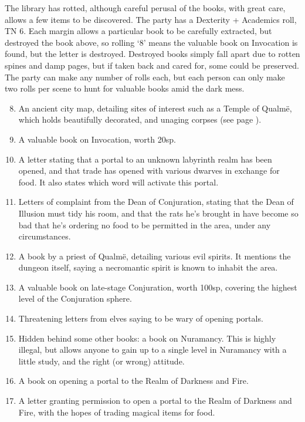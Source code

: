 \begin{multicols}{2}
The library has rotted, although careful perusal of the books, with great care, allows a few items to be discovered.
The party has a Dexterity + Academics roll, TN 6.
Each margin allows a particular book to be carefully extracted, but destroyed the book above, so rolling `8' means the valuable book on Invocation is found, but the letter is destroyed.
Destroyed books simply fall apart due to rotten spines and damp pages, but if taken back and cared for, some could be preserved.
The party can make any number of rolls each, but each person can only make two rolls per scene to hunt for valuable books amid the dark mess.

\begin{enumerate}

\setcounter{enumi}{7}
	\item{An ancient city map, detailing sites of interest such as a Temple of Qualm\"{e}, which holds beautifully decorated, and unaging corpses (see page \pageref{green_tower})}.
	\item{A valuable book on Invocation, worth 20sp.}
	\item{A letter stating that a portal to an unknown labyrinth realm has been opened, and that trade has opened with various dwarves in exchange for food.  It also states which word will activate this portal.}
	\item{Letters of complaint from the Dean of Conjuration, stating that the Dean of Illusion must tidy his room, and that the rats he's brought in have become so bad that he's ordering no food to be permitted in the area, under any circumstances.}
	\item{A book by a priest of Qualm\"{e}, detailing various evil spirits.  It mentions the dungeon itself, saying a necromantic spirit is known to inhabit the area.}
	\item{A valuable book on late-stage Conjuration, worth 100sp, covering the highest level of the Conjuration sphere.}
	\item{Threatening letters from elves saying to be wary of opening portals.}
	\item{Hidden behind some other books: a book on Nuramancy.  This is highly illegal, but allows anyone to gain up to a single level in Nuramancy with a little study, and the right (or wrong) attitude.}
	\item{A book on opening a portal to the Realm of Darkness and Fire.}
	\item{A letter granting permission to open a portal to the Realm of Darkness and Fire, with the hopes of trading magical items for food.}


\end{enumerate}
\end{multicols}
